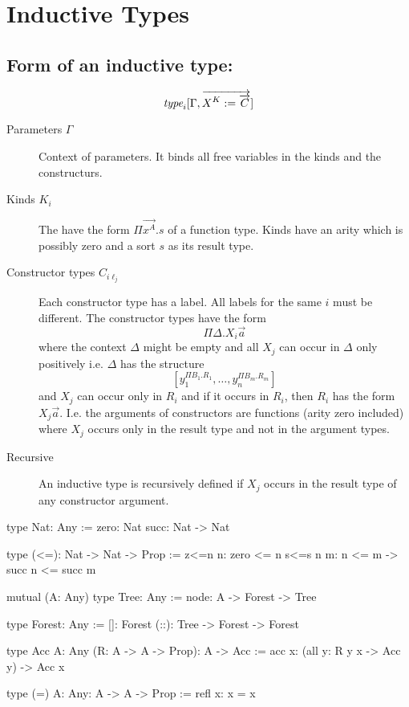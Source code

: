 \section {Inductive Types}


\subsection{Form of an inductive type:}


$$
    {\text{\it type}}_i[\Gamma, {\overrightarrow {X^K := {\overrightarrow {C}}}}]
$$

\begin{description}
    \item [Parameters $\Gamma$] Context of parameters. It binds all free
        variables in the kinds and the constructurs.

    \item [Kinds $K_i$] The have the form $\Pi \vec {x^A}. s$ of a function
        type.
        Kinds have an arity which is possibly zero and a sort $s$ as its
        result type.

    \item [Constructor types $C_{i \ell_j}$] Each constructor type has a label.
        All labels for the same $i$ must be different. The constructor types
        have the form
        $$
            \Pi \Delta. X_i \vec a
        $$
        where the context $\Delta$ might be empty and all $X_j$ can occur in
        $\Delta$ only positively i.e. $\Delta$ has the structure
        $$
            [y_1^{\Pi B_1. R_1}, \ldots, y_n^{\Pi B_m. R_m}]
        $$
        and $X_j$ can occur only in $R_i$ and if it occurs in $R_i$, then $R_i$
        has the form $X_j \vec a$. I.e. the arguments of constructors are
        functions (arity zero included) where $X_j$ occurs only in the result type
        and not in the argument types.

    \item [Recursive]
        An inductive type is recursively defined if $X_j$ occurs in the result
        type of any constructor argument.
\end{description}


\begin{alba}
    type Nat: Any :=
        zero: Nat
        succ: Nat -> Nat


    type (<=): Nat -> Nat -> Prop
    :=
        z<=n {n}: zero <= n
        s<=s {n m}: n <= m -> succ n <= succ m


    mutual (A: Any)
        type Tree: Any :=
            node: A -> Forest -> Tree

        type Forest: Any :=
            []: Forest
            (::): Tree -> Forest -> Forest


    type Acc {A: Any} (R: A -> A -> Prop): A -> Acc
    :=
        acc {x}: (all {y}: R y x -> Acc y) -> Acc x


    type (=) {A: Any}: A -> A -> Prop
    :=
        refl {x}: x = x
\end{alba}



